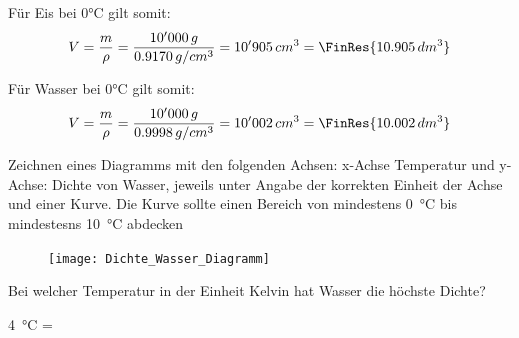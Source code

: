 \begin{questions}
\begin{solution}
        Für Eis bei 0°C gilt somit:
        \begin{equation*}
            V = \dfrac{m}{\rho} = \dfrac{10'000\, g}{0.9170\,g/cm^3} = 10'905\,cm^3 = \FinRes{10.905\,dm^3}
        \end{equation*}

        Für Wasser bei 0°C gilt somit:
        \begin{equation*}
            V = \dfrac{m}{\rho} = \dfrac{10'000\,g}{0.9998\, g/cm^3} = 10'002\,cm^3 = \FinRes{10.002\,dm^3}
        \end{equation*}
    \end{solution}

    \question
    Zeichnen eines Diagramms mit den folgenden Achsen: x-Achse Temperatur und y-Achse: Dichte von Wasser, jeweils unter Angabe der korrekten Einheit der Achse und einer Kurve. Die Kurve sollte einen Bereich von mindestens \SI{0}{\degreeCelsius} bis mindestesns \SI{10}{\degreeCelsius} abdecken

    \begin{solution}
        \begin{figure}[H]
            \texttt{[image: Dichte\_Wasser\_Diagramm]}
        \end{figure}
    \end{solution}

    \question
    Bei welcher Temperatur in der Einheit Kelvin  hat Wasser die höchste Dichte?

    \begin{solution}
        \SI{4}{\degreeCelsius} = 
    \end{solution}


\end{questions}

